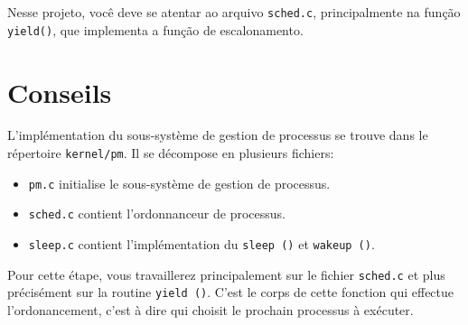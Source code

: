 \documentclass[11pt]{article}
\newif\ifen
\newif\iffr
\begin{document}
		Nesse projeto, você deve se atentar ao arquivo \texttt{sched.c},
		principalmente na função \texttt{yield()}, que implementa a função
		de escalonamento.
\else\ifen
	\subsection*{Starting Point}
	
		The implementation of the process management subsystem is in the
		\texttt{kernel/pm} directory, and it is split into several
		files:
		\begin{itemize}
			\item \texttt{pm.c}: initializes the process management subsystem.
			\item \texttt{sched.c}: process scheduler.
			\item \texttt{sleep.c}: implementations for  \texttt{sleep()} e \texttt{wakeup()}.
		\end{itemize}

		In this assignment, you should focus on the \texttt{sched.c}.
		More precisely in the \texttt{yield()} routine, which is the
		implementation of the process scheduler itself.
\else\iffr
	\section*{Conseils}

		L'implémentation du sous-système de gestion de processus se trouve
		dans le répertoire {\tt kernel/pm}. Il se décompose en plusieurs
		fichiers:

		\begin{itemize}
		\item {\tt pm.c} initialise le sous-système de gestion de processus.

		\item {\tt sched.c} contient l'ordonnanceur de processus.

		\item {\tt sleep.c} contient l'implémentation du {\tt sleep ()} et {\tt wakeup ()}.   
		\end{itemize}

		Pour cette étape, vous travaillerez principalement sur le fichier {\tt sched.c}
		et plus précisément sur la routine {\tt yield ()}. C'est le corps de cette
		fonction qui effectue l'ordonancement, c'est à dire qui choisit le prochain
		processus à exécuter.
\fi\fi\fi
\end{document}
